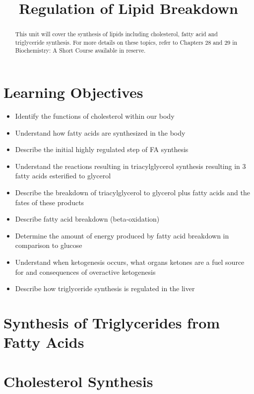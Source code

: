 \documentclass{tufte-handout}
\title{Regulation of Lipid Breakdown}
\author{}
\date{}  %
\begin{document}
\maketitle%

\begin{abstract}
\noindent This unit will cover the synthesis of lipids including cholesterol, fatty acid and triglyceride synthesis.  For more details on these topics, refer to Chapters 28 and 29 in Biochemistry: A Short Course available in reserve\cite{Berg2015}.
\end{abstract}

\tableofcontents

\pagebreak
\section{Learning Objectives}

\begin{itemize}
\item Identify the functions of cholesterol within our body
\item Understand how fatty acids are synthesized in the body
\item Describe the initial highly regulated step of FA synthesis
\item Understand the reactions resulting in triacylglycerol synthesis resulting in 3 fatty acids esterified to glycerol
\item Describe the breakdown of triacylglycerol to glycerol plus fatty acids and the fates of these products
\item Describe fatty acid breakdown (beta-oxidation)
\item Determine the amount of energy produced by fatty acid breakdown in comparison to glucose
\item Understand when ketogenesis occurs, what organs ketones are a fuel source for and consequences of overactive ketogenesis
\item Describe how triglyceride synthesis is regulated in the liver




\end{itemize}

\section{Synthesis of Triglycerides from Fatty Acids}

\section{Cholesterol Synthesis}
\end{document}
